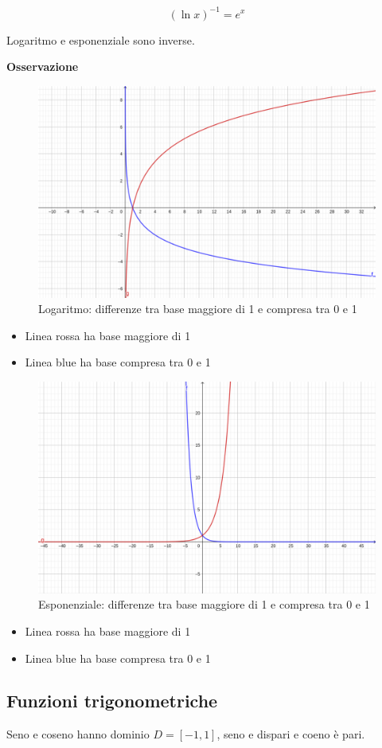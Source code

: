 \begin{equation*}
    (\ln x)^{-1} = e^x
\end{equation*}

Logaritmo e esponenziale sono inverse.

\textbf{Osservazione}
\begin{figure}[h!]
    \centering
    \includegraphics[width=0.5\linewidth]{imgs/log.png}
    \caption{Logaritmo: differenze tra base maggiore di 1 e compresa tra 0 e 1}
    \label{fig:log}
\end{figure}

\begin{itemize}
    \item Linea rossa ha base maggiore di 1
    \item Linea blue ha base compresa tra 0 e 1
\end{itemize}



\begin{figure}[h!]
    \centering
    \includegraphics[width=0.5\linewidth]{imgs/exp.png}
    \caption{Esponenziale: differenze tra base maggiore di 1 e compresa tra 0 e 1}
    \label{fig:exp}
\end{figure}

\begin{itemize}
    \item Linea rossa ha base maggiore di 1
    \item Linea blue ha base compresa tra 0 e 1
\end{itemize}

\subsection{Funzioni trigonometriche}
Seno e coseno hanno dominio $D=[-1, 1]$, seno e dispari e coeno è pari.

